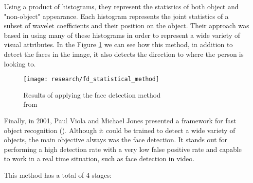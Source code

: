 	Using a product of histograms, they represent the statistics of both object and "non-object" appearance. Each histogram represents the joint statistics of a subset of wavelet coefficients and their position on the object. Their approach was based in using many of these histograms in order to represent a wide variety of visual attributes. In the Figure \ref{fig:statistical_method_face_det} we can see how this method, in addition to detect the faces in the image, it also detects the direction to where the person is looking to.

	\begin{figure}[!ht]
		\centering
		\texttt{[image: research/fd\_statistical\_method]}
		\caption{Results of applying the face detection method \\from \cite{schneiderman2000statistical}}
		\label{fig:statistical_method_face_det}
	\end{figure}

	Finally, in 2001, Paul Viola and Michael Jones presented a framework for fast object recognition (\cite{viola2001rapid}). Although it could be trained to detect a wide variety of objects, the main objective always was the face detection. It stands out for performing a high detection rate with a very low false positive rate and capable to work in a real time situation, such as face detection in video.

	This method has a total of 4 stages:
	
